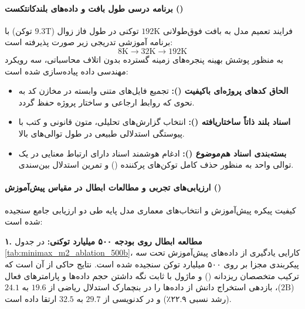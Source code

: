 \paragraph*{برنامه درسی طول بافت و داده‌های بلندکانتکست ()}
فرایند تعمیم مدل به بافت فوق‌طولانی $192\text{K}$ توکنی در طول فاز زوال ($9.3\text{T}$ توکن) با برنامه آموزشی تدریجی زیر صورت پذیرفته است:
\begin{equation}
    8\text{K} \longrightarrow 32\text{K} \longrightarrow 192\text{K}
\end{equation}
به منظور پوشش بهینه پنجره‌های زمینه گسترده بدون اتلاف محاسباتی، سه رویکرد مهندسی داده پیاده‌سازی شده است:
\begin{itemize}
    \item \textbf{الحاق کدهای پروژه‌ای باکیفیت ():} تجمیع فایل‌های متنی وابسته در مخازن کد به نحوی که روابط ارجاعی و ساختار پروژه حفظ گردد.
    \item \textbf{اسناد بلند ذاتاً ساختاریافته ():} انتخاب گزارش‌های تحلیلی، متون قانونی و کتب با پیوستگی استدلالی طبیعی در طول توالی‌های بالا.
    \item \textbf{بسته‌بندی اسناد هم‌موضوع ():} ادغام هوشمند اسناد دارای ارتباط معنایی در یک توالی واحد به منظور حذف کامل توکن‌های پرکننده () و تمرین استدلال بین‌سندی.
\end{itemize}

\paragraph*{ارزیابی‌های تجربی و مطالعات ابطال در مقیاس پیش‌آموزش ()}
کیفیت پیکره پیش‌آموزش و انتخاب‌های معماری مدل پایه  طی دو ارزیابی جامع سنجیده شده است:

\textbf{۱. مطالعه ابطال روی بودجه ۵۰۰ میلیارد توکنی:} در جدول \ref{tab:minimax_m2_ablation_500b}، کارایی یادگیری از داده‌های پیش‌آموزش تحت سه پیکربندی مجزا بر روی ۵۰۰ میلیارد توکن سنجیده شده است. نتایج حاکی از آن است که ترکیب متخصصان ریزدانه () \cite{dai2024deepseekmoe} و ماژول  \cite{gloeckle2024better} با ثابت نگه داشتن حجم داده‌ها و پارامترهای فعال ($2\text{B}$)، بازدهی استخراج دانش از داده‌ها را در بنچمارک استدلال ریاضی  از $19.6$ به $24.1$ (رشد نسبی ۲۲.۹٪) و در کدنویسی  از $29.7$ به $32.5$ ارتقا داده است.

